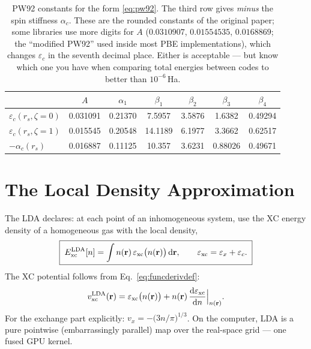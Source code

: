 \begin{table}[htbp]
\centering
\begin{tabular}{@{}lcccccc@{}}
\toprule
 & $A$ & $\alpha_1$ & $\beta_1$ & $\beta_2$ & $\beta_3$ & $\beta_4$\\
\midrule
$\varepsilon_c(r_s, \zeta{=}0)$ & 0.031091 & 0.21370 & 7.5957 & 3.5876 & 1.6382 & 0.49294\\
$\varepsilon_c(r_s, \zeta{=}1)$ & 0.015545 & 0.20548 & 14.1189 & 6.1977 & 3.3662 & 0.62517\\
$-\alpha_c(r_s)$ & 0.016887 & 0.11125 & 10.357 & 3.6231 & 0.88026 & 0.49671\\
\bottomrule
\end{tabular}
\caption{PW92 constants for the form \eqref{eq:pw92}. The third row gives
\emph{minus} the spin stiffness $\alpha_c$. These are the rounded constants
of the original paper; some libraries use more digits for $A$
($0.0310907$, $0.01554535$, $0.0168869$; the ``modified PW92'' used
inside most PBE implementations), which changes $\varepsilon_c$ in the
seventh decimal place. Either is acceptable --- but know which one you
have when comparing total energies between codes to better than
$10^{-6}$\,Ha.}
\label{tab:pw92}
\end{table}

\section{The Local Density Approximation}

The LDA declares: at each point of an inhomogeneous system, use the XC energy
density of a homogeneous gas with the local density,
\begin{equation}
\boxed{\;
E_{\mathrm{xc}}^{\mathrm{LDA}}[n] = \int n(\mathbf{r})\,
\varepsilon_{\mathrm{xc}}\big(n(\mathbf{r})\big)\, \mathrm{d}\mathbf{r},
\qquad
\varepsilon_{\mathrm{xc}} = \varepsilon_x + \varepsilon_c .
\;}
\end{equation}
The XC potential follows from Eq.~\eqref{eq:funcderivdef}:
\begin{equation}
v_{\mathrm{xc}}^{\mathrm{LDA}}(\mathbf{r})
= \varepsilon_{\mathrm{xc}}\big(n(\mathbf{r})\big)
+ n(\mathbf{r})\, \frac{\mathrm{d} \varepsilon_{\mathrm{xc}}}{\mathrm{d} n}\Big|_{n(\mathbf{r})} .
\label{eq:vxclda}
\end{equation}
For the exchange part explicitly:
$v_x = -\big(3n/\pi\big)^{1/3}$. On the computer, LDA is a pure pointwise
(embarrassingly parallel) map over the real-space grid --- one fused GPU
kernel.

